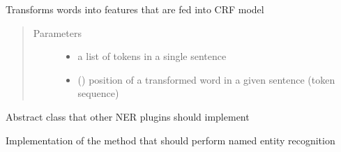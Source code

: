\documentclass[letterpaper,10pt,english]{sphinxmanual}
\begin{document}
\begin{fulllineitems}
\begin{fulllineitems}
\label{\detokenize{index:ner_plugins.NER_CRF.NER_CRF.word2features}}
Transforms words into features that are fed into CRF model
\begin{quote}\begin{description}
\item[{Parameters}] \leavevmode\begin{itemize}
\item {} 
 \textendash{} a list of tokens in a single sentence

\item {} 
 () \textendash{} position of a transformed word in a given sentence (token sequence)

\end{itemize}

\end{description}\end{quote}

\end{fulllineitems}


\end{fulllineitems}


\begin{fulllineitems}
\label{\detokenize{index:ner_plugins.NER_abstract.NER_abstract}}
Abstract class that other NER plugins should implement

\begin{fulllineitems}
\label{\detokenize{index:ner_plugins.NER_abstract.NER_abstract.perform_NER}}
Implementation of the method that should perform named entity recognition

\end{fulllineitems}


\end{fulllineitems}
\end{document}
